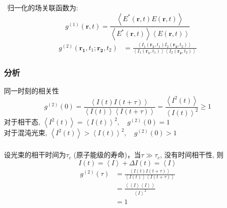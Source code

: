 \begin{frame}
\frametitle{}
 归一化的场关联函数为:
\[  g^{(1)} (\mathbf{r},t) =  \frac{\left\langle E^* (\mathbf{r},t) E (\mathbf{r},t)\right\rangle} {\left\langle E^* (\mathbf{r},t)\right\rangle\left\langle E (\mathbf{r},t)\right\rangle}  \]
\[ \begin{aligned}   
    g^{(2)} (\mathbf{r_1},t_1; \mathbf{r_2},t_2)  
    &= \frac{\left\langle I_1 (\mathbf{r_1},t_1) I_2 (\mathbf{r_2},t_2)\right\rangle}{\left\langle I_1 (\mathbf{r_1},t_1)\right\rangle\left\langle I_2 (\mathbf{r_2},t_2)\right\rangle}
   \end{aligned} \]
\end{frame}

 \begin{frame} 
  \frametitle{分析}
  同一时刻的相关性
  \[  g^{(2)}(0) = \frac{\left\langle I (t)  I (t+ \tau)\right\rangle} {\left\langle I (t) \right\rangle \left\langle I (t+ \tau)\right\rangle} =  \frac{\left\langle I^2 (t)  \right\rangle}{\left\langle I (t)\right\rangle^2 }  \geq 1\]
  对于相干态, $  \left\langle I^2 (t)  \right\rangle = \left\langle I (t) \right\rangle^2, \quad g^{(2)}(0) =1 $ \\ 
  对于混沌光束, $ \left\langle I^2 (t)  \right\rangle > \left\langle I(t) \right\rangle^2, \quad g^{(2)}(0) >1 $
\end{frame}

\begin{frame} 
      \frametitle{}   
  设光束的相干时间为$\tau_c$ (原子能级的寿命)，当$\tau\gg \tau_c$, 没有时间相干性, 则 
  \[ I (t) = \left\langle I \right\rangle  + \Delta I (t) =  \left\langle I  \right\rangle  \] 
  \[ \begin{aligned}
    g^{(2)}(\tau) &= \frac{\left\langle I (t)  I (t+ \tau)\right\rangle }{\left\langle I (t) \right\rangle \left\langle  I (t+ \tau)\right\rangle }\\ 
    &= \frac{\left\langle \left\langle I  \right\rangle  \left\langle I  \right\rangle \right\rangle}{\left\langle I \right\rangle^2} \\
    &= 1 
\end{aligned}\]     
\end{frame}
  
